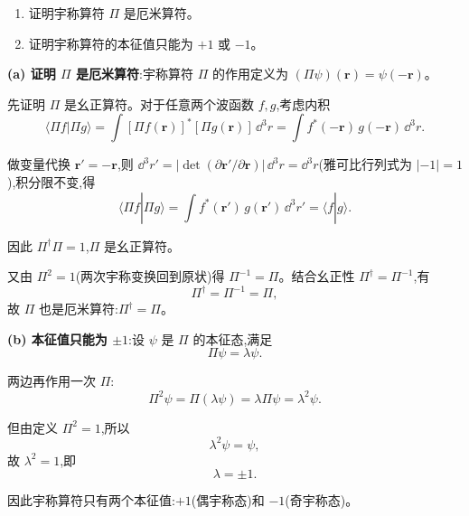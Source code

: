 \begin{question}
\begin{enumerate}
\item 证明宇称算符 $\Pi$ 是厄米算符。
\item 证明宇称算符的本征值只能为 $+1$ 或 $-1$。
\end{enumerate}
\end{question}
\begin{solution}
	\textbf{(a) 证明 $\Pi$ 是厄米算符}:宇称算符 $\Pi$ 的作用定义为 $(\Pi\psi)(\mathbf r)=\psi(-\mathbf r)$。

	先证明 $\Pi$ 是幺正算符。对于任意两个波函数 $f,g$,考虑内积
	\[
	\langle \Pi f|\Pi g\rangle=\int [\Pi f(\mathbf r)]^* [\Pi g(\mathbf r)]\,\dd^3 r
	=\int f^*(-\mathbf r)\,g(-\mathbf r)\,\dd^3 r.
	\]

	做变量代换 $\mathbf r'=-\mathbf r$,则 $\dd^3 r' = |\det(\partial\mathbf r'/\partial\mathbf r)|\,\dd^3 r = \dd^3 r$(雅可比行列式为 $|-1|=1$),积分限不变,得
	\[
	\langle \Pi f|\Pi g\rangle = \int f^*(\mathbf r')\,g(\mathbf r')\,\dd^3 r' = \langle f|g\rangle.
	\]

	因此 $\Pi^\dagger\Pi = 1$,$\Pi$ 是幺正算符。

	又由 $\Pi^2=1$(两次宇称变换回到原状)得 $\Pi^{-1}=\Pi$。结合幺正性 $\Pi^\dagger=\Pi^{-1}$,有
	\[
	\Pi^\dagger = \Pi^{-1} = \Pi,
	\]
	故 $\Pi$ 也是厄米算符:$\boxed{\Pi^\dagger = \Pi}$。

	\textbf{(b) 本征值只能为 $\pm1$}:设 $\psi$ 是 $\Pi$ 的本征态,满足
	\[
	\Pi\psi = \lambda\psi.
	\]

	两边再作用一次 $\Pi$:
	\[
	\Pi^2\psi = \Pi(\lambda\psi) = \lambda\Pi\psi = \lambda^2\psi.
	\]

	但由定义 $\Pi^2=1$,所以
	\[
	\lambda^2\psi = \psi,
	\]
	故 $\lambda^2=1$,即
	\[
	\boxed{\lambda = \pm 1}.
	\]

	因此宇称算符只有两个本征值:$+1$(偶宇称态)和 $-1$(奇宇称态)。
	\end{solution}

